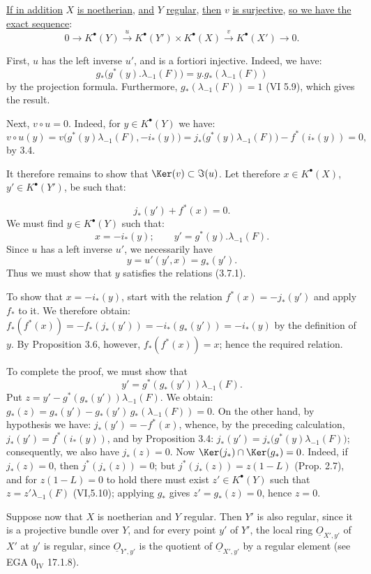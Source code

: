 \uline{If in addition} \(X\) \uline{is noetherian}, \uline{and} \(Y\) \uline{regular}, \uline{then} \(v\) \uline{is surjective}, \uline{so we have the exact sequence}:
\[
0\longrightarrow K^{\bullet}(Y)\xrightarrow{u}K^{\bullet}(Y')\times K^{\bullet}(X)
\xrightarrow{v}K^{\bullet}(X')\longrightarrow0.
\]

First, \(u\) has the left inverse \(u'\), and is a fortiori injective. Indeed, we have:
\[
g_*\bigl(g^*(y).\lambda_{-1}(F)\bigr)
=y.g_*(\lambda_{-1}(F))
\]
by the projection formula. Furthermore, \(g_*(\lambda_{-1}(F))=1\) (VI 5.9), which gives the result.

Next, \(v\circ u=0\). Indeed, for \(y\in K^{\bullet}(Y)\) we have:
\[
v\circ u(y)
=v\bigl(g^*(y)\lambda_{-1}(F),-i_*(y)\bigr)
=j_*\bigl(g^*(y)\lambda_{-1}(F)\bigr)-f^*(i_*(y))=0,
\]
by 3.4.

It therefore remains to show that \(\Ker(v)\subset \Im(u)\). Let therefore \(x\in K^{\bullet}(X)\), \(y'\in K^{\bullet}(Y')\), be such that:

%
\[
j_*(y')+f^*(x)=0.
\]
We must find \(y\in K^{\bullet}(Y)\) such that:
\begin{equation}\tag{3.7.1}
x=-i_*(y);\qquad y'=g^*(y).\lambda_{-1}(F).
\end{equation}
Since \(u\) has a left inverse \(u'\), we necessarily have
\[
y=u'(y',x)=g_*(y').
\]
Thus we must show that \(y\) satisfies the relations (3.7.1).

To show that \(x=-i_*(y)\), start with the relation \(f^*(x)=-j_*(y')\) and apply \(f_*\) to it. We therefore obtain: \(f_*(f^*(x))=-f_*(j_*(y'))=-i_*(g_*(y'))=-i_*(y)\) by the definition of \(y\). By Proposition 3.6, however, \(f_*(f^*(x))=x\); hence the required relation.

To complete the proof, we must show that
\[
y'=g^*(g_*(y'))\lambda_{-1}(F).
\]
Put \(z=y'-g^*(g_*(y'))\lambda_{-1}(F)\). We obtain: \(g_*(z)=g_*(y')-g_*(y')\,g_*(\lambda_{-1}(F))=0\). On the other hand, by hypothesis we have: \(j_*(y')=-f^*(x)\), whence, by the preceding calculation, \(j_*(y')=f^*(i_*(y))\), and by Proposition 3.4: \(j_*(y')=j_*\bigl(g^*(y)\lambda_{-1}(F)\bigr)\); consequently, we also have \(j_*(z)=0\). Now \(\Ker(j_*)\cap\Ker(g_*)=0\). Indeed, if \(j_*(z)=0\), then \(j^*(j_*(z))=0\); but \(j^*(j_*(z))=z(1-L)\) (Prop. 2.7), and for \(z(1-L)=0\) to hold there must exist \(z'\in K^{\bullet}(Y)\) such that \(z=z'\lambda_{-1}(F)\) (VI,5.10); applying \(g_*\) gives \(z'=g_*(z)=0\), hence \(z=0\).

Suppose now that \(X\) is noetherian and \(Y\) regular. Then \(Y'\) is also regular, since it is a projective bundle over \(Y\), and for every point \(y'\) of \(Y'\), the local ring \(\underline{O}_{X',y'}\) of \(X'\) at \(y'\) is regular, since \(\underline{O}_{Y',y'}\) is the quotient of \(\underline{O}_{X',y'}\) by a regular element (see EGA \(0_{\mathrm{IV}}\) 17.1.8).
